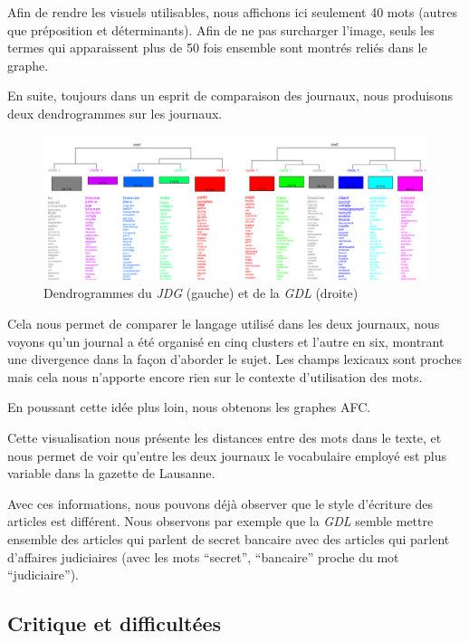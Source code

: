 \documentclass[11pt]{article}
\begin{document}
Afin de rendre les visuels utilisables, nous affichons ici seulement 40
mots (autres que préposition et déterminants). Afin de ne pas surcharger
l'image, seuls les termes qui apparaissent plus de 50 fois ensemble sont
montrés reliés dans le graphe.

En suite, toujours dans un esprit de comparaison des journaux, nous
produisons deux dendrogrammes sur les journaux.

\begin{figure}
\centering
\includegraphics{methodology/dendrogram.png}
\caption{Dendrogrammes du \emph{JDG} (gauche) et de la \emph{GDL}
(droite)}
\end{figure}

Cela nous permet de comparer le langage utilisé dans les deux journaux,
nous voyons qu'un journal a été organisé en cinq clusters et l'autre en
six, montrant une divergence dans la façon d'aborder le sujet. Les
champs lexicaux sont proches mais cela nous n'apporte encore rien sur le
contexte d'utilisation des mots.

En poussant cette idée plus loin, nous obtenons les graphes AFC.

Cette visualisation nous présente les distances entre des mots dans le
texte, et nous permet de voir qu'entre les deux journaux le vocabulaire
employé est plus variable dans la gazette de Lausanne.

Avec ces informations, nous pouvons déjà observer que le style
d'écriture des articles est différent. Nous observons par exemple que la
\emph{GDL} semble mettre ensemble des articles qui parlent de secret
bancaire avec des articles qui parlent d'affaires judiciaires (avec les
mots ``secret'', ``bancaire'' proche du mot ``judiciaire'').

\hypertarget{critique-et-difficultuxe9es}{%
\subsection{Critique et
difficultées}\label{critique-et-difficultuxe9es}}
\end{document}
